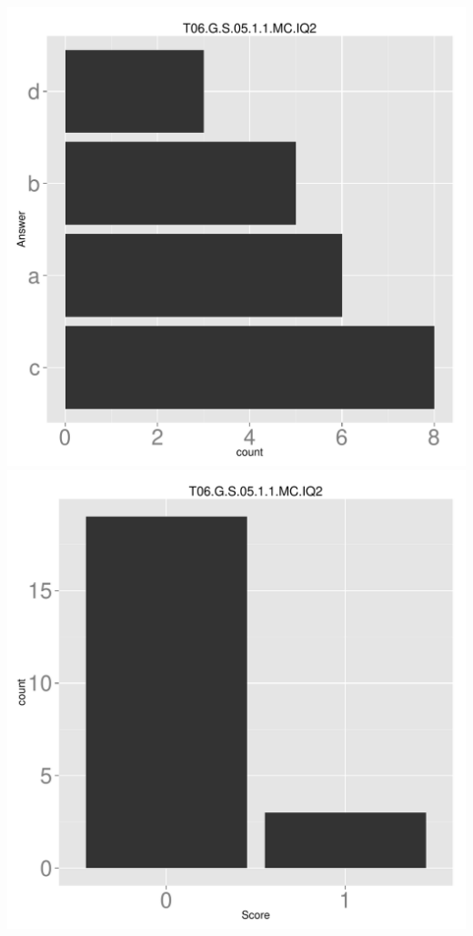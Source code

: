 \documentclass[12pt,nohyper]{tufte-handout}\usepackage[]{graphicx}\usepackage[]{color}
\begin{document}
\begin{center} \includegraphics[width=.45\linewidth]{Topic06_77_answer} \includegraphics[width=.45\linewidth]{Topic06_77_score} \end{center} 
\end{document}
